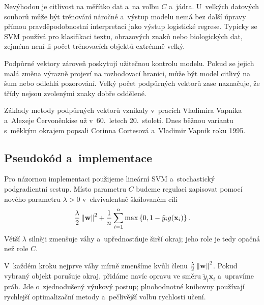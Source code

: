 Nevýhodou je citlivost na měřítko dat a~na volbu \(C\) a~jádra. U~velkých datových souborů může být trénování náročné a~výstup modelu nemá bez další úpravy přímou pravděpodobnostní interpretaci jako výstup logistické regrese. Typicky se SVM používá pro klasifikaci textu, obrazových znaků nebo biologických dat, zejména není-li počet trénovacích objektů extrémně velký.

Podpůrné vektory zároveň poskytují užitečnou kontrolu modelu. Pokud se jejich malá změna výrazně projeví na rozhodovací hranici, může být model citlivý na šum nebo odlehlá pozorování. Velký počet podpůrných vektorů zase naznačuje, že třídy nejsou zvolenými znaky dobře oddělené.


\begin{remark}
    Základy metody podpůrných vektorů vznikaly v~pracích Vladimira Vapnika a~Alexeje Červoněnkise už v~60.~letech 20.~století. Dnes běžnou variantu s~měkkým okrajem popsali Corinna Cortesová a~Vladimir Vapnik roku 1995.
\end{remark}

\subsection{Pseudokód a~implementace}

Pro názornou implementaci použijeme lineární SVM a~stochastický podgradientní sestup. Místo parametru \(C\) budeme regulaci zapisovat pomocí nového parametru \(\lambda>0\) v~ekvivalentně škálovaném cíli
\[
    \frac{\lambda}{2}\left\lVert\mathbf{w}\right\rVert^2
    +
    \frac1n\sum_{i=1}^{n}
    \max\left\{0,1-\tilde y_i g(\mathbf{x}_i)\right\}.
\]
Větší \(\lambda\) silněji zmenšuje váhy a~upřednostňuje širší okraj; jeho role je tedy opačná než role \(C\).

V~každém kroku nejprve váhy mírně zmenšíme kvůli členu \(\frac{\lambda}{2}\left\lVert\mathbf{w}\right\rVert^2\). Pokud vybraný objekt porušuje okraj, přidáme navíc opravu ve směru \(\tilde y_i\mathbf{x}_i\) a~upravíme práh. Jde o~zjednodušený výukový postup; plnohodnotné knihovny používají rychlejší optimalizační metody a~pečlivější volbu rychlosti učení.


